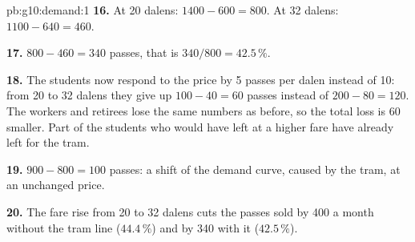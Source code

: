 \begin{solution}{pb:g10:demand:1}
\textbf{16.} At 20 dalens: $1400 - 600 = 800$. At 32 dalens: $1100 - 640 = 460$.

\textbf{17.} $800 - 460 = 340$ passes, that is $340/800 = 42.5\,\%$.

\textbf{18.} The students now respond to the price by 5 passes per dalen instead of 10: from 20 to 32 dalens they give up $100 - 40 = 60$
passes instead of $200 - 80 = 120$. The workers and retirees lose the same numbers as before, so the total loss is 60 smaller. Part of the
students who would have left at a higher fare have already left for the tram.

\textbf{19.} $900 - 800 = 100$ passes: a shift of the demand curve, caused by the tram, at an unchanged price.

\textbf{20.} The fare rise from 20 to 32 dalens cuts the passes sold by 400 a month without the tram line ($44.4\,\%$) and by 340 with it
($42.5\,\%$).
\end{solution}
